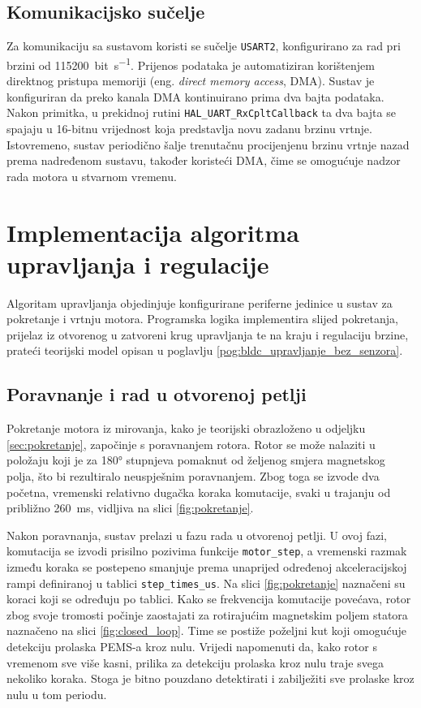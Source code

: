 \documentclass[diplomskirad, upload]{fer}
\begin{document}
\subsection{Komunikacijsko sučelje}
\label{ssec:komunikacija}

Za komunikaciju sa sustavom koristi se sučelje \texttt{USART2}, konfigurirano
za rad pri brzini od \SI{115200}{bit\per\second}. Prijenos podataka je
automatiziran korištenjem direktnog pristupa memoriji (eng. \textit{direct
	memory access}, DMA). Sustav je konfiguriran da preko kanala DMA kontinuirano
prima dva bajta podataka. Nakon primitka, u prekidnoj rutini
\texttt{HAL\_UART\_RxCpltCallback} ta dva bajta se spajaju u 16-bitnu
vrijednost koja predstavlja novu zadanu brzinu vrtnje. Istovremeno, sustav
periodično šalje trenutačnu procijenjenu brzinu vrtnje nazad prema nadređenom
sustavu, također koristeći DMA, čime se omogućuje nadzor rada motora u stvarnom
vremenu.

\section{Implementacija algoritma upravljanja i regulacije}
\label{sec:implementacija_algoritma_i_regulacije}

Algoritam upravljanja objedinjuje konfigurirane periferne jedinice u sustav za
pokretanje i vrtnju motora. Programska logika implementira slijed pokretanja,
prijelaz iz otvorenog u zatvoreni krug upravljanja te na kraju i regulaciju
brzine, prateći teorijski model opisan u poglavlju
\ref{pog:bldc_upravljanje_bez_senzora}.

\subsection{Poravnanje i rad u otvorenoj petlji}
\label{ssec:pokretanje_motora}

Pokretanje motora iz mirovanja, kako je teorijski obrazloženo u odjeljku
\ref{sec:pokretanje}, započinje s poravnanjem rotora. Rotor se može nalaziti u
položaju koji je za \ang{180} stupnjeva pomaknut od željenog smjera magnetskog
polja, što bi rezultiralo neuspješnim poravnanjem. Zbog toga se izvode dva
početna, vremenski relativno dugačka koraka komutacije, svaki u trajanju od
približno \SI{260}{\milli\second}, vidljiva na slici \ref{fig:pokretanje}.

Nakon poravnanja, sustav prelazi u fazu rada u otvorenoj petlji. U ovoj fazi,
komutacija se izvodi prisilno pozivima funkcije \texttt{motor\_step}, a
vremenski razmak između koraka se postepeno smanjuje prema unaprijed određenoj
akceleracijskoj rampi definiranoj u tablici \texttt{step\_times\_us}. Na slici
\ref{fig:pokretanje} naznačeni su koraci koji se određuju po tablici. Kako se
frekvencija komutacije povećava, rotor zbog svoje tromosti počinje zaostajati
za rotirajućim magnetskim poljem statora naznačeno na slici
\ref{fig:closed_loop}. Time se postiže poželjni kut koji omogućuje detekciju
prolaska PEMS-a kroz nulu. Vrijedi napomenuti da, kako rotor s vremenom sve
više kasni, prilika za detekciju prolaska kroz nulu traje svega nekoliko
koraka. Stoga je bitno pouzdano detektirati i zabilježiti sve prolaske kroz
nulu u tom periodu.
\end{document}
